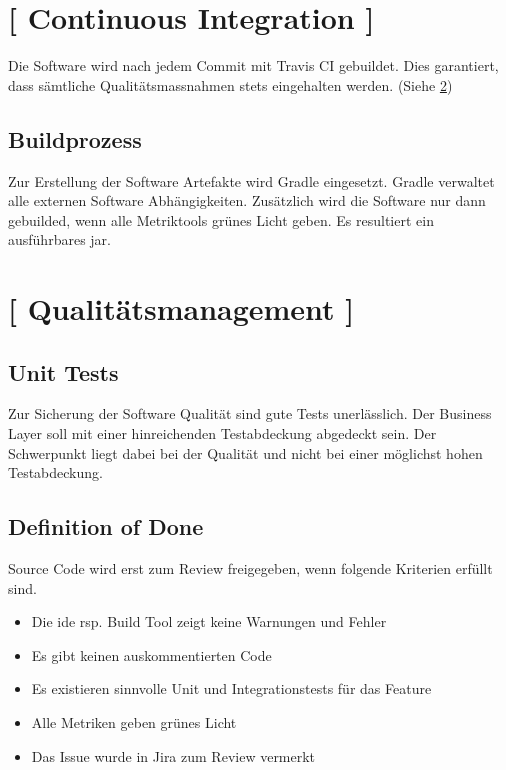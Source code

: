 \documentclass[11pt,a4paper,english,oneside]{book}
\numberwithin{equation}{chapter}
\begin{document}
	\section{ [ Continuous Integration ] }
	Die Software wird nach jedem Commit mit Travis CI \cite{travisci} gebuildet. Dies garantiert, dass sämtliche Qualitätsmassnahmen stets eingehalten werden. (Siehe \ref{sec:qualitymeasures})
	
	\subsection{Buildprozess}
	\label{sec:buildprocess}
	Zur Erstellung der Software Artefakte wird Gradle \cite{gradle} eingesetzt. Gradle verwaltet alle externen Software Abhängigkeiten. Zusätzlich wird die Software nur dann gebuilded, wenn alle Metriktools grünes Licht geben. Es resultiert ein ausführbares \gls{jar}.
		
	\section{ [ Qualitätsmanagement ] }
	\label{sec:qualitymeasures}
	
	\subsection{Unit Tests}
	Zur Sicherung der Software Qualität sind gute Tests unerlässlich. Der Business Layer soll mit einer hinreichenden Testabdeckung abgedeckt sein. Der Schwerpunkt liegt dabei bei der Qualität und nicht bei einer möglichst hohen Testabdeckung.
	
	\subsection{Definition of Done}
	Source Code wird erst zum Review freigegeben, wenn folgende Kriterien erfüllt sind.
	\begin{itemize}
		\item Die \gls{ide} rsp. Build Tool zeigt keine Warnungen und Fehler
		\item Es gibt keinen auskommentierten Code
		\item Es existieren sinnvolle Unit und Integrationstests für das Feature
		\item Alle Metriken geben grünes Licht
		\item Das Issue wurde in Jira \cite{jira} zum Review vermerkt
	\end{itemize}
		
\end{document}
